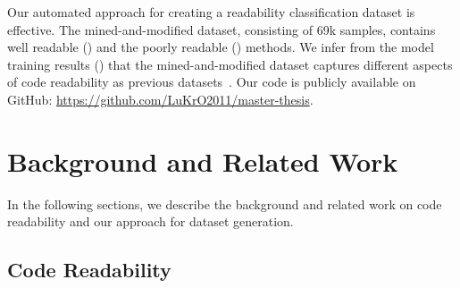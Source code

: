 \documentclass[%
class=scrreprt,
chapterprefix=false,%
open=right,%
twoside=true,%
paper=a4,%
logofile={Logo\_zentral\_farbig\_EN.png},%
thesistype=master,%
UKenglish,%
]{se2thesis}
\theoremstyle{definition}
\newcommand{\citeolddataset}{\cite{buse2009learning, dorn2012general, scalabrino2018comprehensive}\xspace}
\newcommand{\numSamples}{69k\xspace}
\begin{document}
	
	Our automated approach for creating a readability classification dataset is effective. The mined-and-modified dataset, consisting of \numSamples samples, contains well readable () and the poorly readable () methods.
	We infer from the model training results () that the mined-and-modified dataset captures different aspects of code readability as previous datasets~\citeolddataset.
	Our code is publicly available on GitHub: 
		\textcolor{blue}{\url{https://github.com/LuKrO2011/master-thesis}}.
			
\chapter{Background and Related Work} \label{Background and Related Work}
	In the following sections, we describe the background and related work on code readability and our approach for dataset generation.
	
\section{Code Readability} \label{Code Readability}
		
	
\end{document}
